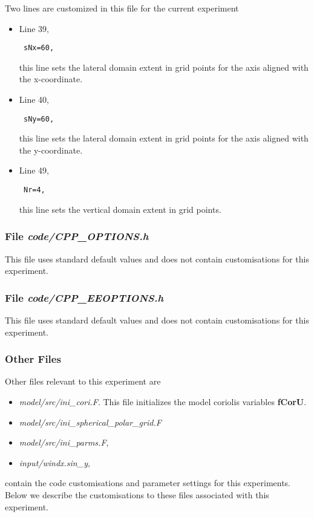 Two lines are customized in this file for the current experiment

\begin{itemize}

\item Line 39, 
\begin{verbatim} sNx=60, \end{verbatim} this line sets
the lateral domain extent in grid points for the
axis aligned with the x-coordinate.

\item Line 40, 
\begin{verbatim} sNy=60, \end{verbatim} this line sets
the lateral domain extent in grid points for the
axis aligned with the y-coordinate.

\item Line 49, 
\begin{verbatim} Nr=4,   \end{verbatim} this line sets
the vertical domain extent in grid points.

\end{itemize}

\begin{small}

\end{small}

\subsubsection{File {\it code/CPP\_OPTIONS.h}}
\label{www:tutorials}

This file uses standard default values and does not contain
customisations for this experiment.


\subsubsection{File {\it code/CPP\_EEOPTIONS.h}}
\label{www:tutorials}

This file uses standard default values and does not contain
customisations for this experiment.

\subsubsection{Other Files }
\label{www:tutorials}

Other files relevant to this experiment are
\begin{itemize}
\item {\it model/src/ini\_cori.F}. This file initializes the model
coriolis variables {\bf fCorU}.
\item {\it model/src/ini\_spherical\_polar\_grid.F}
\item {\it model/src/ini\_parms.F},
\item {\it input/windx.sin\_y},
\end{itemize}
contain the code customisations and parameter settings for this 
experiments. Below we describe the customisations
to these files associated with this experiment.
